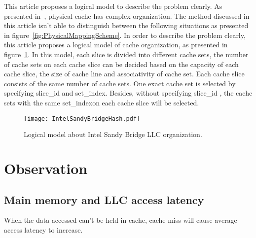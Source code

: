 \documentclass[conference]{IEEEtran}
\newcommand{\SliceID}{slice\_id }
\newcommand{\SetIndex}{set\_index}
\begin{document}
This article proposes a logical model to describe the problem clearly. As presented in~\cite{Multi-core-cache_rajeev}, physical cache has complex organization. The method discussed in this article isn't able to distinguish between the following situations as presented in figure~\ref{fig:PhysicalMappingScheme}. In order to describe the problem clearly, this article proposes a logical model of cache organization, as presented in figure~\ref{fig:LogicalModel}. In this model, each slice is divided into different cache sets, the number of cache sets on each cache slice can be decided based on the capacity of each cache slice, the size of cache line and associativity of cache set. Each cache slice consists of the same number of cache sets. One exact cache set is selected by specifying \SliceID and \SetIndex. Besides, without specifying \SliceID, the cache sets with the same \SetIndex  on each cache slice will be selected. 
\begin{figure}[!htbp]
\centering
\texttt{[image: IntelSandyBridgeHash.pdf]}
\caption{Logical model about Intel Sandy Bridge LLC organization.}
\label{fig:LogicalModel}
\end{figure}
\section{Observation}
\subsection{Main memory and LLC access latency}
When the data accessed can't be held in cache, cache miss will cause average access latency to increase. 
\end{document}
